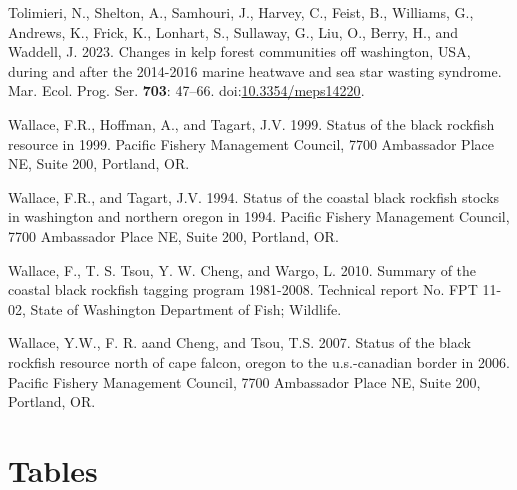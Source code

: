 \documentclass[11pt,
  english,
  letterpaper,
]{article}
\newlength{\cslhangindent}
\newenvironment{CSLReferences}[2] %
 {%
  \setlength{\parindent}{0pt}
  \ifodd #1 \everypar{\setlength{\hangindent}{\cslhangindent}}\ignorespaces\fi
  \ifnum #2 > 0
  \setlength{\parskip}{#2\baselineskip}
  \fi
 }%
 {}
\begin{document}
\begin{CSLReferences}{1}{0}
\leavevmode{}%
Tolimieri, N., Shelton, A., Samhouri, J., Harvey, C., Feist, B., Williams, G., Andrews, K., Frick, K., Lonhart, S., Sullaway, G., Liu, O., Berry, H., and Waddell, J. 2023. Changes in kelp forest communities off washington, {USA}, during and after the 2014-2016 marine heatwave and sea star wasting syndrome. Mar. Ecol. Prog. Ser. \textbf{703}: 47--66. doi:\href{https://doi.org/10.3354/meps14220}{10.3354/meps14220}.

\leavevmode{}%
Wallace, F.R., Hoffman, A., and Tagart, J.V. 1999. Status of the black rockfish resource in 1999. Pacific Fishery Management Council, 7700 Ambassador Place NE, Suite 200, Portland, OR.

\leavevmode{}%
Wallace, F.R., and Tagart, J.V. 1994. Status of the coastal black rockfish stocks in washington and northern oregon in 1994. Pacific Fishery Management Council, 7700 Ambassador Place NE, Suite 200, Portland, OR.

\leavevmode{}%
Wallace, F., T. S. Tsou, Y. W. Cheng, and Wargo, L. 2010. Summary of the coastal black rockfish tagging program 1981-2008. Technical report No. FPT 11-02, State of Washington Department of Fish; Wildlife.

\leavevmode{}%
Wallace, Y.W., F. R. aand Cheng, and Tsou, T.S. 2007. Status of the black rockfish resource north of cape falcon, oregon to the u.s.-canadian border in 2006. Pacific Fishery Management Council, 7700 Ambassador Place NE, Suite 200, Portland, OR.

\end{CSLReferences}

\clearpage

\hypertarget{tables}{%
\section{Tables}\label{tables}}










\end{document}

